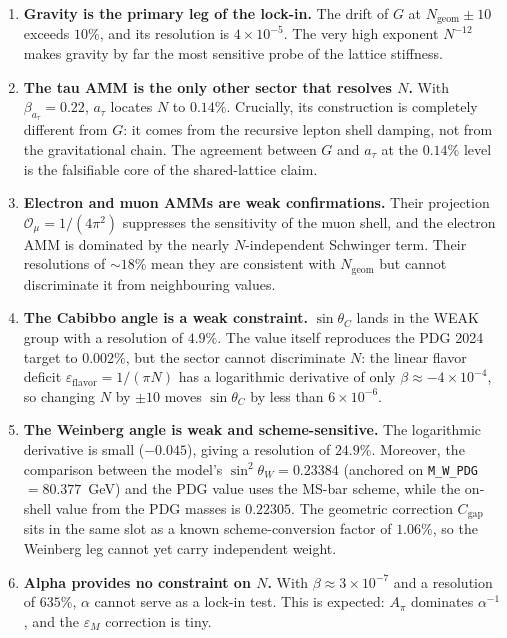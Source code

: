 \documentclass[10pt,a4paper]{article}
\begin{document}
\begin{enumerate}
	\item \textbf{Gravity is the primary leg of the lock-in.}
	The drift of $G$ at $N_{\text{geom}} \pm 10$ exceeds $10\%$, and its
	resolution is $4 \times 10^{-5}$. The very high exponent $N^{-12}$
	makes gravity by far the most sensitive probe of the lattice
	stiffness.
	
	\item \textbf{The tau AMM is the only other sector that resolves $N$.}
	With $\beta_{a_\tau} = 0.22$, $a_\tau$ locates $N$ to $0.14\%$.
	Crucially, its construction is completely different from $G$: it comes
	from the recursive lepton shell damping, not from the gravitational
	chain. The agreement between $G$ and $a_\tau$ at the $0.14\%$ level is
	the falsifiable core of the shared-lattice claim.
	
	\item \textbf{Electron and muon AMMs are weak confirmations.}
	Their projection $\mathcal{O}_\mu = 1/(4\pi^2)$ suppresses the
	sensitivity of the muon shell, and the electron AMM is dominated by
	the nearly $N$-independent Schwinger term. Their resolutions of
	$\sim 18\%$ mean they are consistent with $N_{\text{geom}}$ but cannot
	discriminate it from neighbouring values.
	
	\item \textbf{The Cabibbo angle is a weak constraint.}
	$\sin\theta_C$ lands in the WEAK group with a resolution of $4.9\%$.
	The value itself reproduces the PDG 2024 target to $0.002\%$, but the
	sector cannot discriminate $N$: the linear flavor deficit
	$\varepsilon_{\text{flavor}} = 1/(\pi N)$ has a logarithmic derivative
	of only $\beta \approx -4 \times 10^{-4}$, so changing $N$ by $\pm 10$
	moves $\sin\theta_C$ by less than $6 \times 10^{-6}$.
	
	\item \textbf{The Weinberg angle is weak and scheme-sensitive.}
	The logarithmic derivative is small ($-0.045$), giving a resolution
	of $24.9\%$. Moreover, the comparison between the model's
	$\sin^2\theta_W = 0.23384$ (anchored on \texttt{M\_W\_PDG}
	$= 80.377$~GeV) and the PDG value uses the MS-bar scheme, while the
	on-shell value from the PDG masses is $0.22305$. The geometric
	correction $C_{\text{gap}}$ sits in the same slot as a known
	scheme-conversion factor of $1.06\%$, so the Weinberg leg cannot yet
	carry independent weight.
	
	\item \textbf{Alpha provides no constraint on $N$.}
	With $\beta \approx 3 \times 10^{-7}$ and a resolution of $635\%$,
	$\alpha$ cannot serve as a lock-in test. This is expected: $A_\pi$
	dominates $\alpha^{-1}$, and the $\varepsilon_M$ correction is tiny.
	

\end{enumerate}
\end{document}
